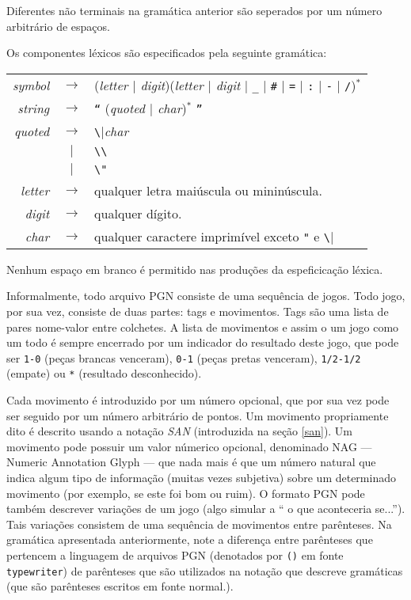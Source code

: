 \documentclass[11pt,a4paper]{article}
\begin{document}
Diferentes n\~ao terminais na gram\'atica anterior s\~ao seperados por
um n\'umero arbitr\'ario de espa\c{c}os. 

Os componentes l\'exicos s\~ao especificados pela seguinte gram\'atica:

\begin{tabular}{rcl}
	\textit{symbol} & $\rightarrow$ & (\textit{letter $|$ digit})(\textit{letter $|$ digit} $|$ \texttt{\_} $|$ 
	\texttt{\#} $|$ \texttt{=} $|$ \texttt{:} $|$ \texttt{-} $|$ \texttt{/})$^{*}$\\
	\textit{string} & $\rightarrow$ & \texttt{``} (\textit{quoted $|$ char})$^{*}$ \texttt{''}\\
	\textit{quoted} & $\rightarrow$ & \verb|\|\textit{char}\\
					& $|$           & \verb|\\|\\
					& $|$           & \verb|\"|\\
	\textit{letter} & $\rightarrow$ & qualquer letra mai\'uscula ou minin\'uscula.\\
	\textit{digit}  & $\rightarrow$ & qualquer d\'igito.\\
	\textit{char}   & $\rightarrow$ & qualquer caractere imprim\'ivel exceto \verb|"| e \verb|\|\\
\end{tabular}

Nenhum espa\c{c}o em branco \'e permitido nas produ\c{c}\~oes da espeficica\c{c}\~ao l\'exica.

Informalmente, todo arquivo PGN consiste de uma sequ\^encia de jogos. Todo jogo, por sua vez, consiste 
de duas partes: tags e movimentos. Tags s\~ao uma lista de pares nome-valor entre colchetes. A lista 
de movimentos e assim o um jogo como um todo \'e sempre encerrado por um indicador do resultado deste jogo,
que pode ser \texttt{1-0} (pe\c{c}as brancas venceram), \texttt{0-1} (pe\c{c}as pretas venceram), 
\texttt{1/2-1/2} (empate) ou \texttt{*} (resultado desconhecido). 

Cada movimento \'e introduzido por um n\'umero opcional, que por sua vez pode ser seguido por um n\'umero
arbitr\'ario de pontos. Um movimento propriamente dito \'e descrito usando a nota\c{c}\~ao \emph{SAN} 
(introduzida na se\c{c}\~ao \ref{san}). Um movimento pode possuir um valor n\'umerico opcional, denominado NAG
--- Numeric Annotation Glyph --- que nada mais \'e que um n\'umero natural que indica algum tipo de informa\c{c}\~ao
(muitas vezes subjetiva) sobre um determinado movimento (por exemplo, se este foi bom ou ruim). O formato PGN pode
tamb\'em descrever varia\c{c}\~oes de um jogo (algo simular a `` o que aconteceria se...''). Tais varia\c{c}\~oes
consistem de uma sequ\^encia de movimentos entre par\^enteses. Na gram\'atica apresentada anteriormente, note a 
diferen\c{c}a entre par\^enteses que pertencem a linguagem de arquivos PGN (denotados por \texttt{()} em fonte 
\texttt{typewriter}) de par\^enteses que s\~ao utilizados na nota\c{c}\~ao que descreve gram\'aticas (que s\~ao 
par\^enteses escritos em fonte normal.).
\end{document}
